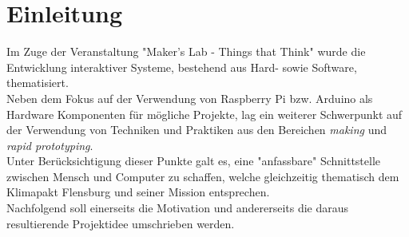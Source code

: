 \documentclass[.../Dokumentation.tex]{subfiles}
\begin{document}
\section{Einleitung}\label{sec-intr}
Im Zuge der Veranstaltung "Maker's Lab - Things that Think" wurde die 
Entwicklung interaktiver Systeme, bestehend aus Hard- sowie Software, 
thematisiert.\\
Neben dem Fokus auf der Verwendung von Raspberry Pi bzw. Arduino als Hardware 
Komponenten für mögliche Projekte, lag ein weiterer Schwerpunkt auf der 
Verwendung von Techniken und Praktiken aus den Bereichen \textit{making} und 
\textit{rapid prototyping}.\\
Unter Berücksichtigung dieser Punkte galt es, eine "anfassbare" Schnittstelle 
zwischen Mensch und Computer zu schaffen, welche gleichzeitig thematisch dem 
Klimapakt Flensburg und seiner Mission entsprechen.\\
Nachfolgend soll einerseits die Motivation und andererseits die daraus 
resultierende Projektidee umschrieben werden.
\end{document}
